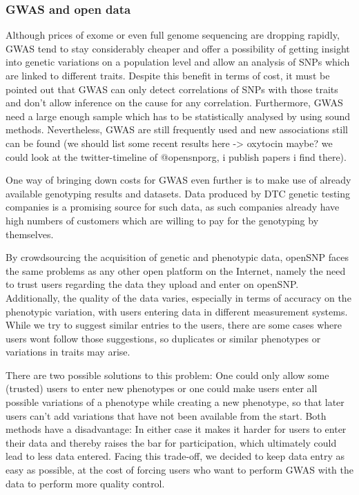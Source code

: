 \documentclass[10pt]{article}
\begin{document}
\subsubsection*{GWAS and open data}
Although prices of exome or even full genome sequencing are dropping rapidly, GWAS tend to stay considerably cheaper and offer a possibility of getting insight into genetic variations on a population level and allow an analysis of SNPs which are linked to different traits. Despite this benefit in terms of cost, it must be pointed out that GWAS can only detect correlations of SNPs with those traits and don't allow inference on the cause for any correlation. Furthermore, GWAS need a large enough sample which has to be statistically analysed by using sound methods. Nevertheless, GWAS are still frequently used and new associations still can be found (we should list some recent results here -> oxytocin maybe? we could look at the twitter-timeline of @opensnporg, i publish papers i find there).

One way of bringing down costs for GWAS even further is to make use of already available genotyping results and datasets. Data produced by DTC genetic testing companies is a promising source for such data, as such companies already have high numbers of customers which are willing to pay for the genotyping by themselves.

By crowdsourcing the acquisition of genetic and phenotypic data, openSNP faces the same problems as any other open platform on the Internet, namely the need to trust users regarding the data they upload and enter on openSNP. Additionally, the quality of the data varies, especially in terms of accuracy on the phenotypic variation, with users entering data in different measurement systems. While we try to suggest similar entries to the users, there are some cases where users wont follow those suggestions, so duplicates or similar phenotypes or variations in traits may arise. 

There are two possible solutions to this problem: One could only allow some (trusted) users to enter new phenotypes or one could make users enter all possible variations of a phenotype while creating a new phenotype, so that later users can't add variations that have not been available from the start. Both methods have a disadvantage: In either case it makes it harder for users to enter their data and thereby raises the bar for participation, which ultimately could lead to less data entered. Facing this trade-off, we decided to keep data entry as easy as possible, at the cost of forcing users who want to perform GWAS with the data to perform more quality control.
\end{document}
